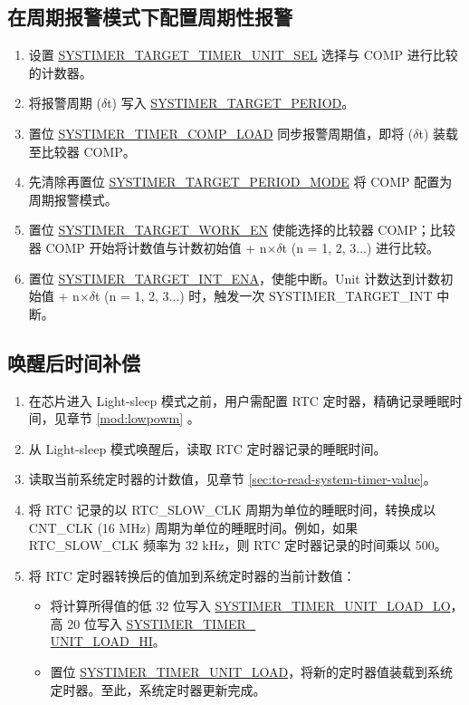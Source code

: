 \documentclass[main\_\_CN.tex]{subfiles}
\begin{document}
\subsection{在周期报警模式下配置周期性报警}
\begin{enumerate}
    \item 设置 \hyperref[fielddesc:SYSTIMERTARGET0TIMERUNITSEL]{SYSTIMER\_TARGET\_TIMER\_UNIT\_SEL} 选择与 COMP 进行比较的计数器。
    \item 将报警周期 ($\delta$t) 写入 \hyperref[fielddesc:SYSTIMERTARGET0PERIOD]{SYSTIMER\_TARGET\_PERIOD}。
    \item 置位 \hyperref[fielddesc:SYSTIMERTIMERCOMP0LOAD]{SYSTIMER\_TIMER\_COMP\_LOAD} 同步报警周期值，即将 ($\delta$t) 装载至比较器 COMP。
    \item 先清除再置位 \hyperref[fielddesc:SYSTIMERTARGET0PERIODMODE]{SYSTIMER\_TARGET\_PERIOD\_MODE} 将 COMP 配置为周期报警模式。
    \item 置位 \hyperref[fielddesc:SYSTIMERTARGET0WORKEN]{SYSTIMER\_TARGET\_WORK\_EN} 使能选择的比较器 COMP；比较器 COMP 开始将计数值与计数初始值 + n×$\delta$t (n = 1, 2, 3...) 进行比较。
    \item 置位 \hyperref[fielddesc:SYSTIMERTARGET0INTENA]{SYSTIMER\_TARGET\_INT\_ENA}，使能中断。Unit 计数达到计数初始值 + n×$\delta$t (n = 1, 2, 3...) 时，触发一次 SYSTIMER\_TARGET\_INT 中断。
\end{enumerate}


\subsection{唤醒后时间补偿}
\begin{enumerate}
    \item 在芯片进入 Light-sleep 模式之前，用户需配置 RTC 定时器，精确记录睡眠时间，见章节 \ref{mod:lowpowm} \textit{}。
    \item 从 Light-sleep 模式唤醒后，读取 RTC 定时器记录的睡眠时间。
    \item 读取当前系统定时器的计数值，见章节  \ref{sec:to-read-system-timer-value}。
    \item 将 RTC 记录的以 RTC\_SLOW\_CLK 周期为单位的睡眠时间，转换成以 CNT\_CLK (16 MHz) 周期为单位的睡眠时间。例如，如果 RTC\_SLOW\_CLK 频率为 32 kHz，则 RTC 定时器记录的时间乘以 500。
    \item 将 RTC 定时器转换后的值加到系统定时器的当前计数值：
    \begin{itemize}
        \item 将计算所得值的低 32 位写入 \hyperref[fielddesc:SYSTIMERTIMERUNIT0LOADLO]{SYSTIMER\_TIMER\_UNIT\_LOAD\_LO}，高 20 位写入 \hyperref[fielddesc:SYSTIMERTIMERUNIT0LOADHI]{SYSTIMER\_TIMER\_\\UNIT{}\_LOAD\_HI}。
        \item 置位 \hyperref[fielddesc:SYSTIMERTIMERUNIT0LOAD]{SYSTIMER\_TIMER\_UNIT\_LOAD}，将新的定时器值装载到系统定时器。至此，系统定时器更新完成。
        \end{itemize}
\end{enumerate}
\end{document}
